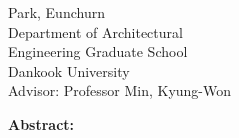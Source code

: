 \begin{center}
\end{center}
\begin{flushright}
Park, Eunchurn\\
Department of Architectural\\
Engineering Graduate School\\
Dankook University\\
\vspace{0.3cm}
Advisor: Professor Min, Kyung-Won
\end{flushright}

{\large\textbf{Abstract:}}
